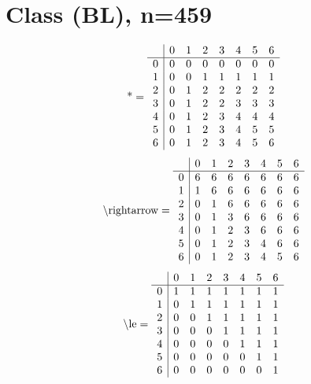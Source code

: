\documentclass[11pt]{article}
\begin{document}
\section{Class (BL), n=459}
\[\text{*} = 
\begin{array}{r | r r r r r r r}
 & 0 & 1 & 2 & 3 & 4 & 5 & 6 \\ \hline
0 & 0 & 0 & 0 & 0 & 0 & 0 & 0 \\
1 & 0 & 0 & 1 & 1 & 1 & 1 & 1 \\
2 & 0 & 1 & 2 & 2 & 2 & 2 & 2 \\
3 & 0 & 1 & 2 & 2 & 3 & 3 & 3 \\
4 & 0 & 1 & 2 & 3 & 4 & 4 & 4 \\
5 & 0 & 1 & 2 & 3 & 4 & 5 & 5 \\
6 & 0 & 1 & 2 & 3 & 4 & 5 & 6 \\
\end{array}
\]
\[\text{\textbackslash rightarrow} = 
\begin{array}{r | r r r r r r r}
 & 0 & 1 & 2 & 3 & 4 & 5 & 6 \\ \hline
0 & 6 & 6 & 6 & 6 & 6 & 6 & 6 \\
1 & 1 & 6 & 6 & 6 & 6 & 6 & 6 \\
2 & 0 & 1 & 6 & 6 & 6 & 6 & 6 \\
3 & 0 & 1 & 3 & 6 & 6 & 6 & 6 \\
4 & 0 & 1 & 2 & 3 & 6 & 6 & 6 \\
5 & 0 & 1 & 2 & 3 & 4 & 6 & 6 \\
6 & 0 & 1 & 2 & 3 & 4 & 5 & 6 \\
\end{array}
\]
\[\text{\textbackslash le} = 
\begin{array}{r | r r r r r r r}
 & 0 & 1 & 2 & 3 & 4 & 5 & 6 \\ \hline
0 & 1 & 1 & 1 & 1 & 1 & 1 & 1 \\
1 & 0 & 1 & 1 & 1 & 1 & 1 & 1 \\
2 & 0 & 0 & 1 & 1 & 1 & 1 & 1 \\
3 & 0 & 0 & 0 & 1 & 1 & 1 & 1 \\
4 & 0 & 0 & 0 & 0 & 1 & 1 & 1 \\
5 & 0 & 0 & 0 & 0 & 0 & 1 & 1 \\
6 & 0 & 0 & 0 & 0 & 0 & 0 & 1 \\
\end{array}
\]
\end{document}
